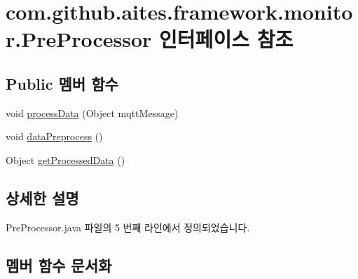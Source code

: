\hypertarget{interfacecom_1_1github_1_1aites_1_1framework_1_1monitor_1_1_pre_processor}{}\section{com.\+github.\+aites.\+framework.\+monitor.\+Pre\+Processor 인터페이스 참조}
\label{interfacecom_1_1github_1_1aites_1_1framework_1_1monitor_1_1_pre_processor}
\subsection*{Public 멤버 함수}
\begin{DoxyCompactItemize}
\item 
void \mbox{\hyperlink{interfacecom_1_1github_1_1aites_1_1framework_1_1monitor_1_1_pre_processor_a12af8342f8691d31a4230f3b7aedbd8b}{process\+Data}} (Object mqtt\+Message)
\item 
void \mbox{\hyperlink{interfacecom_1_1github_1_1aites_1_1framework_1_1monitor_1_1_pre_processor_ab1a270c321103c4368619b89dba25cec}{data\+Preprocess}} ()
\item 
Object \mbox{\hyperlink{interfacecom_1_1github_1_1aites_1_1framework_1_1monitor_1_1_pre_processor_ad95b5624d9641cd1973dfa5bb3864935}{get\+Processed\+Data}} ()
\end{DoxyCompactItemize}


\subsection{상세한 설명}


Pre\+Processor.\+java 파일의 5 번째 라인에서 정의되었습니다.



\subsection{멤버 함수 문서화}
\mbox{\label{interfacecom_1_1github_1_1aites_1_1framework_1_1monitor_1_1_pre_processor_ab1a270c321103c4368619b89dba25cec}} 
